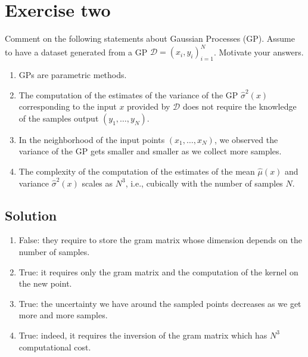 \section{Exercise two}

Comment on the following statements about Gaussian Processes (GP). 
Assume to have a dataset generated from a GP $\mathcal{D} = (x_i, y_i)^N_{i=1}$.
Motivate your answers.
\begin{enumerate}
    \item GPs are parametric methods.
    \item The computation of the estimates of the variance of the GP $\hat{\sigma}^2(x)$ corresponding to the input $x$ provided by $\mathcal{D}$ does not require the knowledge of the samples output $(y_1,\ldots, y_N)$.
    \item In the neighborhood of the input points $(x_1,\ldots,x_N)$, we observed the variance of the GP gets smaller and smaller as we collect more samples.
    \item The complexity of the computation of the estimates of the mean $\hat{\mu}(x)$ and variance $\hat{\sigma}^2(x)$ scales as $N^3$, i.e., cubically with the number of samples $N$.
\end{enumerate}

\subsection*{Solution}
\begin{enumerate}
    \item False: they require to store the gram matrix whose dimension depends on the number of samples.
    \item True: it requires only the gram matrix and the computation of the kernel on the new point.
    \item True: the uncertainty we have around the sampled points decreases as we get more and more samples.
    \item True: indeed, it requires the inversion of the gram matrix which has $N^3$ computational cost.
\end{enumerate}